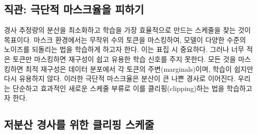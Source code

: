 \documentclass{article} %
\newcommand{\vkl}[1]{\textcolor{blue}{[VK: #1]}}
\newcommand{\TODO}[1]{\textcolor{red}{[TODO: #1]}}
\begin{document}
 \subsection{직관: 극단적 마스크율을 피하기}
경사 추정량의 분산을 최소화하고 학습을 가장 효율적으로 만드는 스케줄을 찾는 것이 목표이다.
%
마스크 환경에서는 무작위 수의 토큰을 마스킹하여, 모델이 다양한 수준의 노이즈를 되돌리는 법을 학습하게 하고자 한다. 이는 표집 시 중요하다.
그러나 너무 적은 토큰만 마스킹하면 재구성이 쉽고 유용한 학습 신호를 주지 못한다. 모든 것을 마스킹하면 최적 재구성은 데이터 분포에서 각 토큰의 주변(marginals)이며, 학습이 쉽지만 다시 유용하지 않다. 이러한 극단적 마스크율은 분산이 큰 나쁜 경사로 이어진다. 우리는 단순하고 효과적인 새로운 스케줄 부류로 이를 클리핑(clipping)하는 법을 학습하고자 한다.



\subsection{저분산 경사를 위한 클리핑 스케줄}
\end{document}
